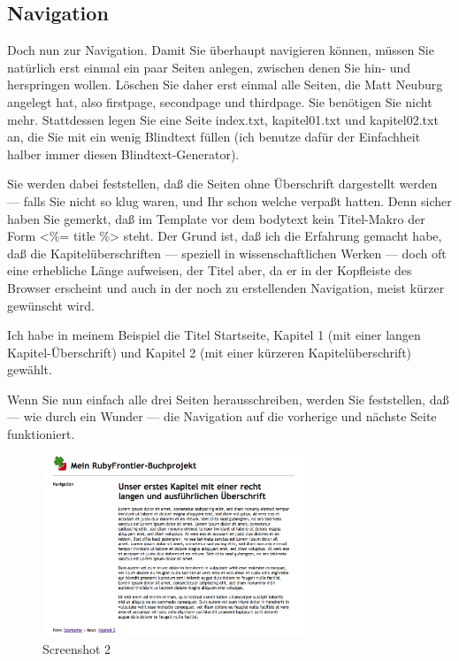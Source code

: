 \documentclass[11pt]{report}
\begin{document}
\subsection{Navigation}
\label{sec-2-6-3-3}


Doch nun zur Navigation. Damit Sie überhaupt navigieren können, müssen
Sie natürlich erst einmal ein paar Seiten anlegen, zwischen denen Sie
hin- und herspringen wollen. Löschen Sie daher erst einmal alle
Seiten, die Matt Neuburg angelegt hat, also firstpage, secondpage und
thirdpage. Sie benötigen Sie nicht mehr. Stattdessen legen Sie eine
Seite index.txt, kapitel01.txt und kapitel02.txt an, die Sie mit ein
wenig Blindtext füllen (ich benutze dafür der Einfachheit halber immer
diesen Blindtext-Generator).


Sie werden dabei feststellen, daß die Seiten ohne Überschrift
dargestellt werden — falls Sie nicht so klug waren, und Ihr schon
welche verpaßt hatten. Denn sicher haben Sie gemerkt, daß im Template
vor dem bodytext kein Titel-Makro der Form <\%= title \%> steht. Der
Grund ist, daß ich die Erfahrung gemacht habe, daß die
Kapitelüberschriften — speziell in wissenschaftlichen Werken — doch
oft eine erhebliche Länge aufweisen, der Titel aber, da er in der
Kopfleiste des Browser erscheint und auch in der noch zu erstellenden
Navigation, meist kürzer gewünscht wird.


Ich habe in meinem Beispiel die Titel Startseite, Kapitel 1 (mit einer
langen Kapitel-Überschrift) und Kapitel 2 (mit einer kürzeren
Kapitelüberschrift) gewählt.


Wenn Sie nun einfach alle drei Seiten herausschreiben, werden Sie
feststellen, daß — wie durch ein Wunder — die Navigation auf die
vorherige und nächste Seite funktioniert.

\begin{figure}[h!]
\centering
\includegraphics[width=0.7\textwidth]{./images/buchprojekt02.png}
\caption{\label{buchprojekt02}Screenshot 2}
\end{figure}
\end{document}
